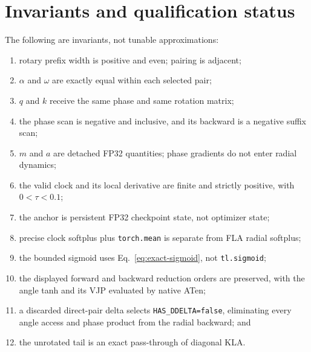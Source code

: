 \documentclass[11pt]{article}
\begin{document}
\section{Invariants and qualification status}

The following are invariants, not tunable approximations:
\begin{enumerate}[leftmargin=1.8em]
  \item rotary prefix width is positive and even; pairing is adjacent;
  \item $\alpha$ and $\omega$ are exactly equal within each selected pair;
  \item $q$ and $k$ receive the same phase and same rotation matrix;
  \item the phase scan is negative and inclusive, and its backward is a negative suffix scan;
  \item $m$ and $a$ are detached FP32 quantities; phase gradients do not enter radial dynamics;
  \item the valid clock and its local derivative are finite and strictly positive, with
        $0<\tau<0.1$;
  \item the anchor is persistent FP32 checkpoint state, not optimizer state;
  \item precise clock softplus plus \texttt{torch.mean} is separate from FLA radial softplus;
  \item the bounded sigmoid uses Eq.~\eqref{eq:exact-sigmoid}, not \texttt{tl.sigmoid};
  \item the displayed forward and backward reduction orders are preserved, with the angle tanh
        and its VJP evaluated by native ATen;
  \item a discarded direct-pair delta selects \texttt{HAS\_DDELTA=false}, eliminating every angle
        access and phase product from the radial backward; and
  \item the unrotated tail is an exact pass-through of diagonal KLA.
\end{enumerate}
\end{document}

